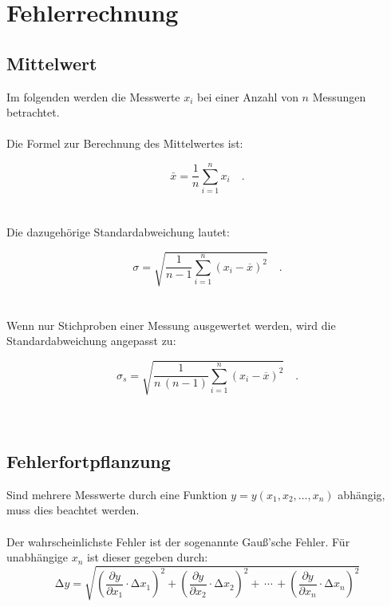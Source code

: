 \newpage
\section{Fehlerrechnung}
\label{sec:fehlerrechnung}

\subsection{Mittelwert}
\label{subsec:mittelwert}
  Im folgenden werden die Messwerte $x_i$ bei einer
  Anzahl von $n$ Messungen betrachtet.\\
  \\
  Die Formel zur Berechnung des Mittelwertes ist:

  \begin{equation}
    \bar{x}=\frac{1}{n} \sum_{i=1}^n x_i \quad .
    \label{eqn:mittelwert}
  \end{equation}
  \\\\
  Die dazugehörige Standardabweichung lautet:

  \begin{equation}
    \sigma = \sqrt{\frac{1}{n-1} \sum_{i=1}^n (x_i - \overline{x})^2} \quad .
    \label{eqn:std1}
  \end{equation}
  \\\\
  Wenn nur Stichproben einer Messung ausgewertet werden,
  wird die Standardabweichung angepasst zu:

  \begin{equation}
    \sigma_s = \sqrt{\frac{1}{n\,(n-1)} \sum_{i=1}^n (x_i - \overline{x})^2} \quad .
    \label{eqn:std2}
  \end{equation}
  \\\\

\subsection{Fehlerfortpflanzung}
\label{subsec:fehlerfortplanzung}
  Sind mehrere Messwerte durch eine Funktion $y=y(x_1, x_2, \dots, x_n)$ abhängig,
  muss dies beachtet werden. \\\\
  Der wahrscheinlichste Fehler ist der sogenannte Gauß'sche Fehler.
  Für unabhängige $x_n$ ist dieser gegeben durch:\\

  \begin{equation}
    \increment y=\sqrt{
    \left(\dfrac{\partial y}{\partial {x_1}}\cdot\increment x_1\right)^{\!2} +
    \left(\dfrac{\partial y}{\partial {x_2}}\cdot\increment x_2\right)^{\!2}
    +\,\dotsb\,+
    \left(\dfrac{\partial y}{\partial {x_n}}\cdot\increment x_n\right)^{\!2}
    }
    \label{eqn:gaußfehler}
  \end{equation}
